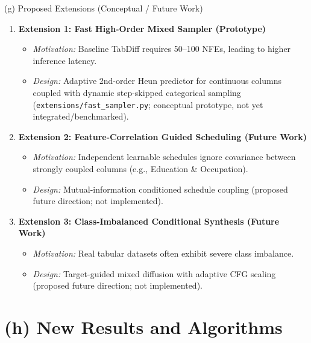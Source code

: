 \documentclass[aspectratio=169, 10pt]{beamer}
\begin{document}
\begin{frame}{(g) Proposed Extensions (Conceptual / Future Work)}
  \begin{enumerate}
    \item \textbf{Extension 1: Fast High-Order Mixed Sampler (Prototype)}
      \begin{itemize}
        \item \emph{Motivation:} Baseline TabDiff requires 50--100 NFEs, leading to higher inference latency.
        \item \emph{Design:} Adaptive 2nd-order Heun predictor for continuous columns coupled with dynamic step-skipped categorical sampling (\texttt{extensions/fast\_sampler.py}; conceptual prototype, not yet integrated/benchmarked).
      \end{itemize}
    \vspace{0.2cm}
    \item \textbf{Extension 2: Feature-Correlation Guided Scheduling (Future Work)}
      \begin{itemize}
        \item \emph{Motivation:} Independent learnable schedules ignore covariance between strongly coupled columns (e.g., Education \& Occupation).
        \item \emph{Design:} Mutual-information conditioned schedule coupling (proposed future direction; not implemented).
      \end{itemize}
    \vspace{0.2cm}
    \item \textbf{Extension 3: Class-Imbalanced Conditional Synthesis (Future Work)}
      \begin{itemize}
        \item \emph{Motivation:} Real tabular datasets often exhibit severe class imbalance.
        \item \emph{Design:} Target-guided mixed diffusion with adaptive CFG scaling (proposed future direction; not implemented).
      \end{itemize}
  \end{enumerate}
\end{frame}

\section{(h) New Results and Algorithms}
\end{document}
